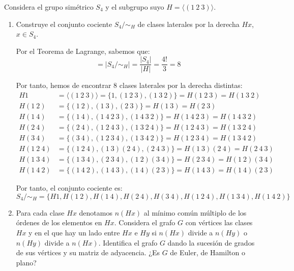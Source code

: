 \begin{ejercicio}\label{ej:1.37}
    Considera el grupo simétrico $S_4$ y el subgrupo suyo $H = \langle (1\ 2\ 3) \rangle$.
    \begin{enumerate}
        \item Construye el conjunto cociente $S_4/\sim_H$ de clases laterales por la derecha $Hx$, $x \in S_4$.
        
        Por el Teorema de Lagrange, sabemos que:
        \begin{equation*}
            [S_4:H]=\left|S_4/\sim_H\right|=\frac{|S_4|}{|H|}=\frac{4!}{3}=8
        \end{equation*}

        Por tanto, hemos de encontrar 8 clases laterales por la derecha distintas:
        \begin{align*}
            H1&=\langle (1\ 2\ 3)\rangle=\{1, (1\ 2\ 3), (1\ 3\ 2)\}=H(1\ 2\ 3)=H(1\ 3\ 2)\\
            H(1\ 2)&=\{(1\ 2), (1\ 3), (2\ 3)\}=H(1\ 3)=H(2\ 3)\\
            H(1\ 4)&=\{(1\ 4), (1\ 4\ 2\ 3), (1\ 4\ 3\ 2)\}=H(1\ 4\ 2\ 3)=H(1\ 4\ 3\ 2)\\
            H(2\ 4)&=\{(2\ 4), (1\ 2\ 4\ 3), (1\ 3\ 2\ 4)\}=H(1\ 2\ 4\ 3)=H(1\ 3\ 2\ 4)\\
            H(3\ 4)&=\{(3\ 4), (1\ 2\ 3\ 4), (1\ 3\ 4\ 2)\}=H(1\ 2\ 3\ 4)=H(1\ 3\ 4\ 2)\\
            H(1\ 2\ 4)&=\{(1\ 2\ 4), (1\ 3)(2\ 4), (2\ 4\ 3)\}=H(1\ 3)(2\ 4)=H(2\ 4\ 3)\\
            H(1\ 3\ 4)&=\{(1\ 3\ 4), (2\ 3\ 4), (1\ 2)(3\ 4)\}=H(2\ 3\ 4)=H(1\ 2)(3\ 4)\\
            H(1\ 4\ 2)&=\{(1\ 4\ 2), (1\ 4\ 3), (1\ 4)(2\ 3)\}=H(1\ 4\ 3)=H(1\ 4)(2\ 3)
        \end{align*}

        Por tanto, el conjunto cociente es:
        \begin{equation*}
            S_4/\sim_H=\{H1, H(1\ 2), H(1\ 4), H(2\ 4), H(3\ 4), H(1\ 2\ 4), H(1\ 3\ 4), H(1\ 4\ 2)\}
        \end{equation*}
        \item Para cada clase $Hx$ denotamos $n(Hx)$ al mínimo común múltiplo de los órdenes de los elementos en $Hx$. Considera el grafo $G$ con vértices las clases $Hx$ y en el que hay un lado entre $Hx$ e $Hy$ si $n(Hx)$ divide a $n(Hy)$ o $n(Hy)$ divide a $n(Hx)$. Identifica el grafo $G$ dando la sucesión de grados de sus vértices y su matriz de adyacencia. ¿Es $G$ de Euler, de Hamilton o plano?
        

\end{enumerate}
\end{ejercicio}
